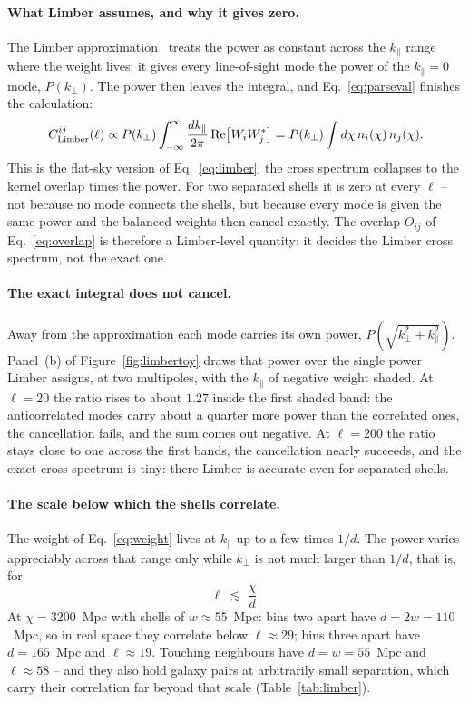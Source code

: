 \documentclass[11pt]{article}
\begin{document}
\paragraph{What Limber assumes, and why it gives zero.}
The Limber approximation~\cite{Limber1953,LoVerde2008} treats the
power as constant across the $k_\parallel$ range where the weight
lives: it gives every line-of-sight mode the power of the
$k_\parallel = 0$ mode, $P(k_\perp)$.  The power then leaves the
integral, and Eq.~\eqref{eq:parseval} finishes the calculation:
\begin{equation}
  C^{ij}_{\rm Limber}(\ell) \propto P(k_\perp)
  \int_{-\infty}^{\infty} \frac{dk_\parallel}{2\pi}\,
  {\rm Re}\!\left[ W_i W_j^* \right]
  = P(k_\perp) \int d\chi\, n_i(\chi)\, n_j(\chi).
  \label{eq:limberflat}
\end{equation}
This is the flat-sky version of Eq.~\eqref{eq:limber}: the cross
spectrum collapses to the kernel overlap times the power.  For two
separated shells it is zero at every $\ell$ -- not because no mode
connects the shells, but because every mode is given the same power
and the balanced weights then cancel exactly.  The overlap $O_{ij}$
of Eq.~\eqref{eq:overlap} is therefore a Limber-level quantity: it
decides the Limber cross spectrum, not the exact one.

\paragraph{The exact integral does not cancel.}
Away from the approximation each mode carries its own power,
$P(\sqrt{k_\perp^2 + k_\parallel^2})$.  Panel~(b) of
Figure~\ref{fig:limbertoy} draws that power over the single power
Limber assigns, at two multipoles, with the $k_\parallel$ of
negative weight shaded.  At $\ell = 20$ the ratio rises to about
$1.27$ inside the first shaded band: the anticorrelated modes carry
about a quarter more power than the correlated ones, the
cancellation fails, and the sum comes out negative.  At $\ell = 200$
the ratio stays close to one across the first bands, the
cancellation nearly succeeds, and the exact cross spectrum is tiny:
there Limber is accurate even for separated shells.

\paragraph{The scale below which the shells correlate.}
The weight of Eq.~\eqref{eq:weight} lives at $k_\parallel$ up to a
few times $1/d$.  The power varies appreciably across that range
only while $k_\perp$ is not much larger than $1/d$, that is, for
\begin{equation}
  \ell \;\lesssim\; \frac{\chi}{d}.
  \label{eq:limberscale}
\end{equation}
At $\chi = 3200$~Mpc with shells of $w \approx 55$~Mpc: bins two
apart have $d = 2w = 110$~Mpc, so in real space they correlate
below $\ell \approx 29$; bins three apart have $d = 165$~Mpc and
$\ell \approx 19$.  Touching neighbours have $d = w = 55$~Mpc and
$\ell \approx 58$ -- and they also hold galaxy pairs at arbitrarily
small separation, which carry their correlation far beyond that
scale (Table~\ref{tab:limber}).
\end{document}
